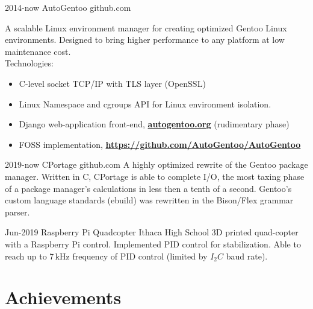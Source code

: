 \documentclass[]{alternate}          %
\begin{document}
\begin{entrylist}
\entry
{2014-now}
{AutoGentoo }
{github.com}
{A scalable Linux environment manager for creating optimized Gentoo Linux environments. Designed to bring higher performance to any platform at low maintenance cost. \\
Technologies:
\begin{itemize}%
	\item C-level socket TCP/IP with TLS layer (OpenSSL)
	\item Linux Namespace and cgroups API for Linux environment isolation.
	\item Django web-application front-end, \textbf{\href{https://autogentoo.org}{autogentoo.org}} (rudimentary phase)
	\item FOSS implementation, \textbf{\href{https://github.com/AutoGentoo/AutoGentoo}{https://github.com/AutoGentoo/AutoGentoo}}
\end{itemize}

}

\entry
{2019-now}
{CPortage}
{github.com}
{A highly optimized rewrite of the Gentoo package manager. Written in C, CPortage is able to complete I/O, the most taxing phase of a package manager's calculations in less then a tenth of a second. Gentoo's custom language standards (ebuild) was rewritten in the Bison/Flex grammar parser.}

\entry
{Jun-2019}
{Raspberry Pi Quadcopter }
{Ithaca High School}
{3D printed quad-copter with a Raspberry Pi control. Implemented PID control for stabilization. Able to reach up to 7\,kHz frequency of PID control (limited by $I_2C$ baud rate). }
{\vspace{-0.3cm}}
\end{entrylist}

\pagebreak
\section{Achievements}
\end{document}

